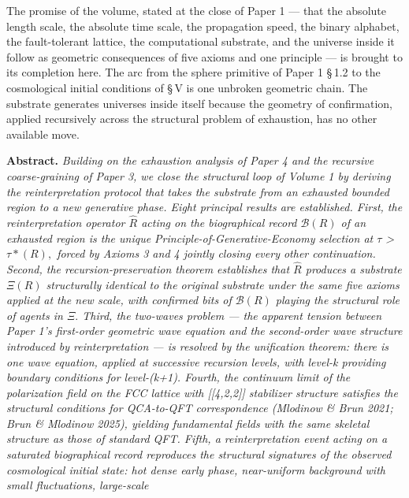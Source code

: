 \documentclass[11pt,oneside]{report}
\theoremstyle{definition}
\theoremstyle{remark}
\newenvironment{paperabstract}
  {\begin{center}\begin{minipage}{0.88\textwidth}\small
   \noindent\textbf{Abstract.}\itshape\space}
  {\end{minipage}\end{center}\vspace{0.4em}}
\begin{document}
The promise of the volume, stated at the close of Paper 1 --- that the
absolute length scale, the absolute time scale, the propagation speed,
the binary alphabet, the fault-tolerant lattice, the computational
substrate, and the universe inside it follow as geometric consequences
of five axioms and one principle --- is brought to its completion here.
The arc from the sphere primitive of Paper 1 \S\,1.2 to the cosmological
initial conditions of \S\,V is one unbroken geometric chain. The substrate
generates universes inside itself because the geometry of confirmation,
applied recursively across the structural problem of exhaustion, has no
other available move.

\begin{paperabstract}
Building on the exhaustion analysis of Paper 4 and the recursive
coarse-graining of Paper 3, we close the structural loop of Volume 1 by
deriving the reinterpretation protocol that takes the substrate from an
exhausted bounded region to a new generative phase. Eight principal
results are established. First, the reinterpretation operator \ensuremath{\hat{R}} acting
on the biographical record \ensuremath{\mathcal{B}(R)} of an exhausted region is the unique
Principle-of-Generative-Economy selection at \ensuremath{\tau} \textgreater{} \ensuremath{\tau *(R),}
forced by Axioms 3 and 4 jointly closing every other continuation.
Second, the recursion-preservation theorem establishes that \ensuremath{\hat{R}} produces a
substrate \ensuremath{\Xi (R)} structurally identical to the original substrate under
the same five axioms applied at the new scale, with confirmed bits of
\ensuremath{\mathcal{B}(R)} playing the structural role of agents in \ensuremath{\Xi .} Third, the two-waves
problem --- the apparent tension between Paper 1's first-order geometric
wave equation and the second-order wave structure introduced by
reinterpretation --- is resolved by the unification theorem: there is
one wave equation, applied at successive recursion levels, with level-k
providing boundary conditions for level-(k+1). Fourth, the continuum
limit of the polarization field on the FCC lattice with
[[4,2,2]] stabilizer structure satisfies the structural
conditions for QCA-to-QFT correspondence (Mlodinow \& Brun 2021; Brun \&
Mlodinow 2025), yielding fundamental fields with the same skeletal
structure as those of standard QFT. Fifth, a reinterpretation event
acting on a saturated biographical record reproduces the structural
signatures of the observed cosmological initial state: hot dense early
phase, near-uniform background with small fluctuations, large-scale

\end{paperabstract}
\end{document}
